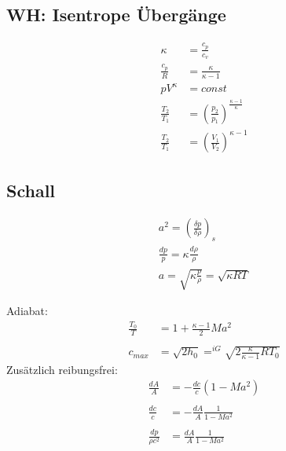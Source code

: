 \documentclass[12pt]{article}
\begin{document}
\subsection{WH: Isentrope Übergänge}
\begin{tcolorbox}[colback=backblue,colframe=borderblue,title=Isentropie]
\begin{align*}
\kappa&=\frac{c_p}{c_v}\\
\frac{c_p}{R}&=\frac{\kappa}{\kappa-1}\\
pV^\kappa&=const\\
\frac{T_2}{T_1}&=\left(\frac{p_2}{p_1}\right)^{\frac{\kappa-1}{\kappa}}\\
\frac{T_2}{T_1}&=\left(\frac{V_1}{V_2}\right)^{\kappa-1}
\end{align*}
\end{tcolorbox}
\subsection{Schall}
\begin{align*}
a^2=\left(\frac{\delta p}{\delta \rho}\right)_s\\
\frac{dp}{p}=\kappa \frac{d\rho}{\rho}\\
a=\sqrt{\kappa\frac{p}{\rho}}=\sqrt{\kappa R T}
\end{align*}

\begin{tcolorbox}[colback=backblue,colframe=borderblue,title=Machzahl]
Adiabat:
\begin{align*}
\frac{T_0}{T}&=1+\frac{\kappa -1}{2}Ma^2\\ \\
c_{max}&=\sqrt{2h_0}=^{iG}\sqrt{2\frac{\kappa}{\kappa -1}RT_0}
\end{align*}
Zusätzlich reibungsfrei:
\begin{align*}
\frac{dA}{A}&=-\frac{dc}{c}(1-Ma^2)\\ \\
\frac{dc}{c}&=-\frac{dA}{A}\frac{1}{1-Ma^2}\\ \\
\frac{dp}{\rho c^2}&=\frac{dA}{A}\frac{1}{1-Ma^2}
\end{align*}
\end{tcolorbox}
\end{document}
